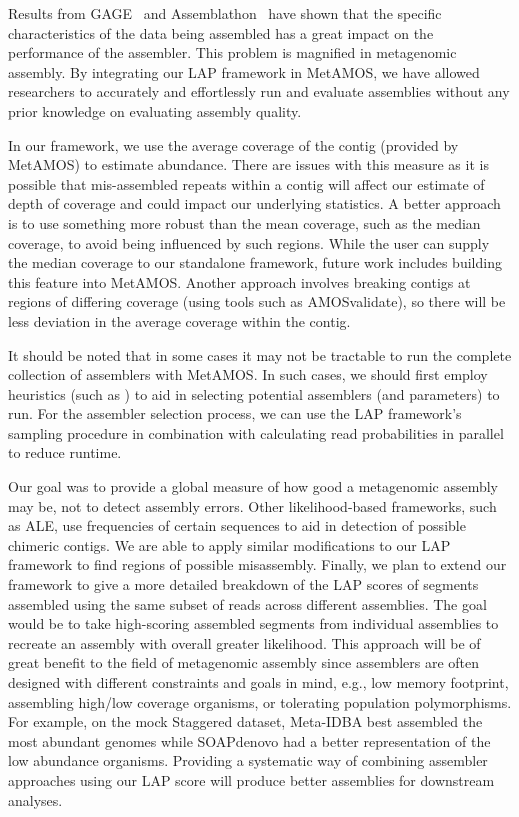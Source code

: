 \documentclass[12pt,\mydriver]{thesis}
\begin{document}
Results from GAGE~\cite{salzberg2011gage} and Assemblathon~\cite{earl2011assemblathon,bradnam2013assemblathon} have shown that the specific characteristics of the data being assembled has a great impact on the performance of the assembler.
This problem is magnified in metagenomic assembly.
By integrating our LAP framework in MetAMOS, we have allowed researchers to accurately and effortlessly run and evaluate assemblies without any prior knowledge on evaluating assembly quality.

In our framework, we use the average coverage of the contig (provided by MetAMOS) to estimate abundance.
There are issues with this measure as it is possible that mis-assembled repeats within a contig will affect our estimate of depth of coverage and could impact our underlying statistics.
A better approach is to use something more robust than the mean coverage, such as the median coverage, to avoid being influenced by such regions.
While the user can supply the median coverage to our standalone framework, future work includes building this feature into MetAMOS.
Another approach involves breaking contigs at regions of differing coverage (using tools such as AMOSvalidate\cite{phillippy2008genome}), so there will be less deviation in the average coverage within the contig.

It should be noted that in some cases it may not be tractable to run the complete collection of assemblers with MetAMOS.
In such cases, we should first employ heuristics (such as \cite{chikhi2013informed}) to aid in selecting potential assemblers (and parameters) to run.
For the assembler selection process, we can use the LAP framework's sampling procedure in combination with calculating read probabilities in parallel to reduce runtime.

Our goal was to provide a global measure of how good a metagenomic assembly may be, not to detect assembly errors.
Other likelihood-based frameworks, such as ALE, use frequencies of certain sequences to aid in detection of possible chimeric contigs.
We are able to apply similar modifications to our LAP framework to find regions of possible misassembly.
Finally, we plan to extend our framework to give a more detailed breakdown of the LAP scores of segments assembled using the same subset of reads across different assemblies.
The goal would be to take high-scoring assembled segments from individual assemblies to recreate an assembly with overall greater likelihood.
This approach will be of great benefit to the field of metagenomic assembly since assemblers are often designed with different constraints and goals in mind, e.g., low memory footprint, assembling high/low coverage organisms, or tolerating population polymorphisms.
For example, on the mock Staggered dataset, Meta-IDBA best assembled the most abundant genomes while SOAPdenovo had a better representation of the low abundance organisms.
Providing a systematic way of combining assembler approaches using our LAP score will produce better assemblies for downstream analyses.
\end{document}
